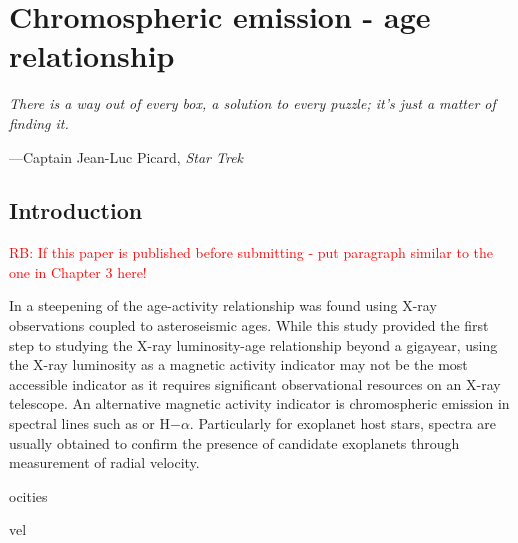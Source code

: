 
\chapter{Chromospheric emission - age relationship} %

\label{Chapter4} %

\epigraph{\itshape There is a way out of every box, a solution to every puzzle; it's just a matter of finding it.}{---Captain Jean-Luc Picard, \itshape Star Trek}

\section{Introduction}
\textcolor{red}{RB: If this paper is published before submitting - put paragraph similar to the one in Chapter 3 here!}

In \citet{Booth_etal_2017} a steepening of the age-activity relationship was found using X-ray observations coupled to asteroseismic ages. While this study provided the first step to studying the X-ray luminosity-age relationship beyond a gigayear, using the X-ray luminosity as a magnetic activity indicator may not be the most accessible indicator as it requires significant observational resources on an X-ray telescope. An alternative magnetic activity indicator is chromospheric emission in spectral lines such as \caII or H$-\alpha$. Particularly for exoplanet host stars, spectra are usually obtained to confirm the presence of candidate exoplanets through measurement of radial velocity. 









ocities

 vel





